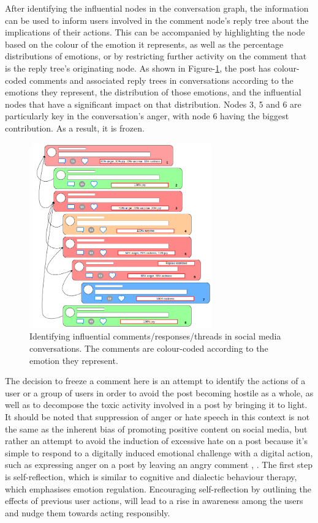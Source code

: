 \documentclass[acmtog]{acmart}
\begin{document}
After identifying the influential nodes in the conversation graph, the information can be used to inform users involved in the comment node's reply tree about the implications of their actions. This can be accompanied by highlighting the node based on the colour of the emotion it represents, as well as the percentage distributions of emotions, or by restricting further activity on the comment that is the reply tree's originating node. As shown in Figure-\ref{fig:Emotion}, the post has colour-coded comments and associated reply trees in conversations according to the emotions they represent, the distribution of those emotions, and the influential nodes that have a significant impact on that distribution. Nodes 3, 5 and 6 are particularly key in the conversation's anger, with node 6 having the biggest contribution. As a result, it is frozen.
\begin{figure}[h]
  
    \centering
    \includegraphics[width=8cm,height=8cm,keepaspectratio]{emotion_impact.png}
  \caption{Identifying influential comments/responses/threads in social media conversations. The comments are colour-coded according to the emotion they represent.}
  \label{fig:Emotion}
  \end{figure}

The decision to freeze a comment here is an attempt to identify the actions of a user or a group of users in order to avoid the post becoming hostile as a whole, as well as to decompose the toxic activity involved in a post by bringing it to light. It should be noted that suppression of anger or hate speech in this context is not the same as the inherent bias of promoting positive content on social media, but rather an attempt to avoid the induction of excessive hate on a post because it's simple to respond to a digitally induced emotional challenge with a digital action, such as expressing anger on a post by leaving an angry comment \cite{wang2021role}, \cite{smith2022digital}. The first step is self-reflection, which is similar to cognitive and dialectic behaviour therapy, which emphasises emotion regulation. Encouraging self-reflection by outlining the effects of previous user actions, will lead to a rise in awareness among the users and nudge them towards acting responsibly. 
\end{document}
